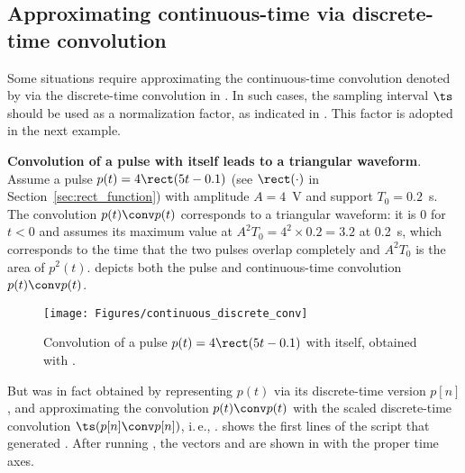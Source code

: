 \subsection{Approximating continuous-time via discrete-time convolution}
\label{sec:continuousViaDiscreteConvolution}

Some situations require approximating the continuous-time convolution denoted by 
 via the discrete-time convolution in .
%
In such cases, the sampling interval $\ts$ should be used as a normalization factor, 
as indicated in . This factor is adopted
in the next example.

\bExample \textbf{Convolution of a pulse with itself leads to a triangular waveform}.
Assume a pulse $p(t) = 4\rect(5t-0.1)$  (see $\rect(\cdot)$ in Section~\ref{sec:rect_function}) with
 amplitude $A=4$~V and support $T_0=0.2$~s. 
The convolution $p(t) \conv p(t)$ corresponds to a triangular waveform: it is 0 for $t<0$ and assumes its maximum value at $A^2 T_0 = 4^2 \times 0.2 = 3.2$ at 0.2~s, which corresponds to the time that the two pulses
overlap completely and $A^2 T_0$ is the area of $p^2(t)$.
 depicts both the pulse and continuous-time convolution $p(t) \conv p(t)$.

\begin{figure}
\centering
\texttt{[image: Figures/continuous\_discrete\_conv]}
\caption{Convolution of a pulse $p(t) = 4 \rect(5t-0.1)$ with itself, obtained with .\label{fig:continuous_discrete_conv}}
\end{figure}

But 
 was in fact obtained 
by representing $p(t)$ via its discrete-time version $p[n]$,
and  approximating the convolution $p(t) \conv p(t)$ with
the scaled discrete-time convolution
$\ts (p[n] \conv p[n])$, i.\,e., .
 shows the first lines of
the script that generated .
After running , the vectors  and  
 are shown in  with the proper time axes.


